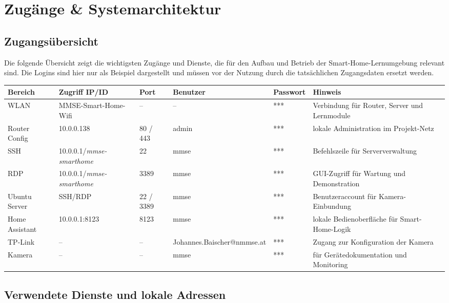 \chapter{Zugänge \& Systemarchitektur}

\section{Zugangsübersicht}

Die folgende Übersicht zeigt die wichtigsten Zugänge und Dienste, die für den Aufbau und Betrieb der Smart-Home-Lernumgebung relevant sind. Die Logins sind hier nur als Beispiel dargestellt und müssen vor der Nutzung durch die tatsächlichen Zugangsdaten ersetzt werden.

\begin{tabularx}{\linewidth}{X X X X >{\raggedright\arraybackslash}p{1cm} >{\raggedright\arraybackslash}p{3.6cm}}
    \rowcolor{SmartLight}
    \textbf{Bereich} & \textbf{Zugriff IP/ID} & \textbf{Port} & \textbf{Benutzer} & \textbf{Passwort} & \textbf{Hinweis} \\
    \hline
    WLAN  & MMSE-Smart-Home-Wifi & -- & -- & *** & Verbindung für Router, Server und Lernmodule \\
    \hline
    Router Config & 10.0.0.138 & 80 / 443 & admin & *** & lokale Administration im Projekt-Netz \\
    \hline
    SSH & 10.0.0.1/\textit{mmse-smarthome}  & 22 & mmse & *** & Befehlszeile für Serververwaltung \\
    \hline
    RDP & 10.0.0.1/\textit{mmse-smarthome} & 3389 & mmse & *** & GUI-Zugriff für Wartung und Demonstration \\
    \hline
    Ubuntu Server & SSH/RDP & 22 / 3389 & mmse & *** & Benutzeraccount für Kamera-Einbundung\\
    \hline
    Home Assistant & 10.0.0.1:8123 & 8123 & mmse & *** & lokale Bedienoberfläche für Smart-Home-Logik \\
    \hline
    TP-Link & -- & -- & Johannes.Baischer@nmmse.at & *** & Zugang zur Konfiguration der Kamera\\
    \hline
    Kamera & -- & -- & mmse & *** & für Gerätedokumentation und Monitoring \\
\end{tabularx}

\section{Verwendete Dienste und lokale Adressen}

